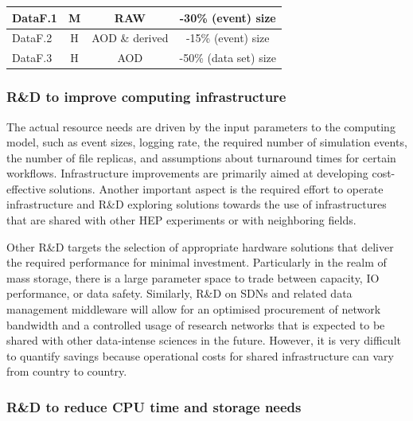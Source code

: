 \begin{table}[tbph]
\begin{tabular}{|l|c|c|c|}
    \cellcolor{tablerowheader} DataF.1            &      M      &  RAW                    & -30\% (event) size\\ \hline
    \cellcolor{tablerowheader} DataF.2            &      H      &  AOD \& derived         & -15\% (event) size\\ \hline
    \cellcolor{tablerowheader} DataF.3            &      H      &  AOD                    & -50\% (data set) size\\ \hline
    \end{tabular}
    \label{tab:effects-of-rnd}
\end{table}

\subsubsection{R\&D to improve computing infrastructure}

The actual resource needs are driven by the input parameters to the computing model, such as event sizes, logging rate, the required number of simulation events, the number of file replicas, and assumptions about turnaround times for certain workflows. Infrastructure improvements are primarily aimed at developing cost-effective solutions. Another important aspect is the required effort to operate infrastructure and R\&D exploring solutions towards the use of infrastructures that are shared with other \gls{HEP} experiments or with neighboring fields.

Other R\&D targets the selection of appropriate hardware solutions that deliver the required performance for minimal investment. Particularly in the realm of mass storage, there is a large parameter space to trade between capacity, \gls{IO} performance, or data safety. Similarly, R\&D on SDNs and related data management middleware will allow for an optimised procurement of network bandwidth and a controlled usage of research networks that is expected to be shared with other data-intense sciences in the future. However, it is very difficult to quantify savings because operational costs for shared infrastructure can vary from country to country.

\subsubsection{R\&D to reduce \gls{CPU} time and storage needs}

